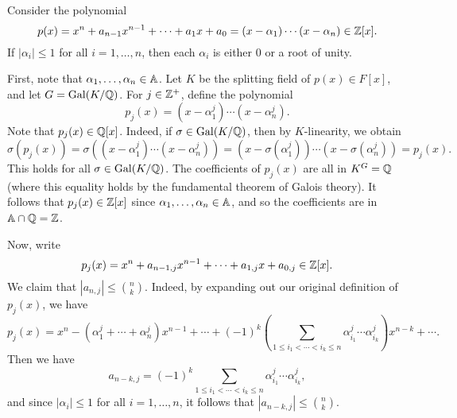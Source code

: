 \begin{theo}{}
    Consider the polynomial 
    \[ p(x) = x^n + a_{n-1} x^{n-1} + \cdots + a_1 x + a_0 = 
    (x - \alpha_1) \cdots (x - \alpha_n) \in \mathbb{Z}[x]. \] 
    If $|\alpha_i| \leq 1$ for all $i = 1, \dots, n$, then each $\alpha_i$ is 
    either $0$ or a root of unity. 
\end{theo}
\begin{pf}
    First, note that $\alpha_1, \dots, \alpha_n \in \mathbb{A}$. Let $K$ be the splitting 
    field of $p(x) \in F[x]$, and let $G = \operatorname{Gal}(K/\mathbb{Q})$. For $j \in \mathbb{Z}^+$, define 
    the polynomial 
    \[ p_j(x) = (x - \alpha_1^j) \cdots (x - \alpha_n^j). \] 
    Note that $p_j(x) \in \mathbb{Q}[x]$. Indeed, if $\sigma \in \operatorname{Gal}(K/\mathbb{Q})$, then 
    by $K$-linearity, we obtain 
    \[ \sigma(p_j(x)) = \sigma((x - \alpha_1^j) \cdots (x - \alpha_n^j)) 
    = (x - \sigma(\alpha_1^j)) \cdots (x - \sigma(\alpha_n^j)) = p_j(x). \] 
    This holds for all $\sigma \in \operatorname{Gal}(K/\mathbb{Q})$. The coefficients of $p_j(x)$ 
    are all in $K^G = \mathbb{Q}$ (where this equality holds by the fundamental 
    theorem of Galois theory). It follows that $p_j(x) \in \mathbb{Z}[x]$ since 
    $\alpha_1, \dots, \alpha_n \in \mathbb{A}$, and so the coefficients are in 
    $\mathbb{A} \cap \mathbb{Q} = \mathbb{Z}$. 

    Now, write 
    \[ p_j(x) = x^n + a_{n-1,j} x^{n-1} + \cdots + a_{1,j} x + a_{0,j} \in \mathbb{Z}[x]. \] 
    We claim that $|a_{n,j}| \leq \binom{n}{k}$. Indeed, by expanding out 
    our original definition of $p_j(x)$, we have 
    \[ p_j(x) = x^n - (\alpha_1^j + \cdots + \alpha_n^j) x^{n-1} + \cdots 
    + (-1)^k \left( \sum_{1\leq i_1 < \cdots < i_k \leq n} \alpha_{i_1}^j \cdots 
    \alpha_{i_k}^j \right) x^{n-k} + \cdots. \]
    Then we have 
    \[ a_{n-k,j} = (-1)^k \sum_{1\leq i_1 < \cdots < i_k \leq n} \alpha_{i_1}^j \cdots 
    \alpha_{i_k}^j, \] 
    and since $|\alpha_i| \leq 1$ for all $i = 1, \dots, n$, it follows that 
    $|a_{n-k,j}| \leq \binom{n}{k}$. 
\end{pf}